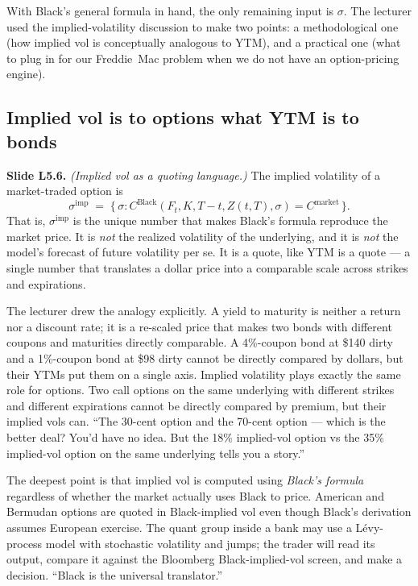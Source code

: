 With Black's general formula in hand, the only remaining input is
$\sigma$. The lecturer used the implied-volatility discussion to make
two points: a methodological one (how implied vol is conceptually
analogous to YTM), and a practical one (what to plug in for our
Freddie~Mac problem when we do not have an option-pricing engine).

\subsection{Implied vol is to options what YTM is to bonds}\label{L5-sec:ivol-language}

\begin{keyblock}
\textbf{Slide L5.6.} \emph{(Implied vol as a quoting language.)}
The implied volatility of a market-traded option is
\[
  \sigma^{\text{imp}} \;=\;
   \bigl\{\, \sigma : C^{\text{Black}}(F_t, K, T-t, Z(t,T), \sigma)
              = C^{\text{market}} \,\bigr\}.
\]
That is, $\sigma^{\text{imp}}$ is the unique number that makes Black's
formula reproduce the market price. It is \emph{not} the realized
volatility of the underlying, and it is \emph{not} the model's
forecast of future volatility per se. It is a quote, like YTM is a
quote --- a single number that translates a dollar price into a
comparable scale across strikes and expirations.
\end{keyblock}

The lecturer drew the analogy explicitly. A yield to maturity is
neither a return nor a discount rate; it is a re-scaled price that
makes two bonds with different coupons and maturities directly
comparable. A 4\%-coupon bond at \$140 dirty and a 1\%-coupon bond at
\$98 dirty cannot be directly compared by dollars, but their YTMs put
them on a single axis. Implied volatility plays exactly the same role
for options. Two call options on the same underlying with different
strikes and different expirations cannot be directly compared by
premium, but their implied vols can. ``The 30-cent option and the
70-cent option --- which is the better deal? You'd have no idea. But
the 18\% implied-vol option vs the 35\% implied-vol option on the same
underlying tells you a story.''

The deepest point is that implied vol is computed using \emph{Black's
formula} regardless of whether the market actually uses Black to
price. American and Bermudan options are quoted in Black-implied vol
even though Black's derivation assumes European exercise. The quant
group inside a bank may use a Lévy-process model with stochastic
volatility and jumps; the trader will read its output, compare it
against the Bloomberg Black-implied-vol screen, and make a decision.
``Black is the universal translator.''

